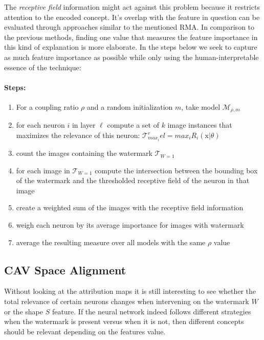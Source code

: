 {The \textit{receptive field} information might act against this problem because it restricts attention to the encoded concept. It's overlap with the feature in question can be evaluated through approaches similar to the mentioned RMA. 
In comparison to the previous methods, finding one value that measures the feature importance in this kind of explanation is more elaborate. In the steps below we seek to capture as much feature importance as possible while only using the human-interpretable essence of the technique:

\paragraph{Steps:}
\begin{enumerate}
    \item For a coupling ratio $\rho$ and a random initialization $m$, take model $\mathcal{M}_{\rho, m}$
    \item for each neuron $i$ in layer $\ell$ compute a set of $k$ image instances that maximizes the relevance of this neuron: $\mathcal{T}_{max_i}^rel = max_i R_i(\mathrm{x} | \theta)$ 
    \item count the images containing the watermark $\mathcal{T}_{W=1}$
    \item for each image in $\mathcal{T}_{W=1}$ compute the intersection between the bounding box of the watermark and the thresholded receptive field of the neuron in that image
    \item create a weighted sum of the images with the receptive field information
    \item weigh each neuron by its average importance for images with watermark
    \item average the resulting measure over all models with the same $\rho$ value 
\end{enumerate}}


\subsection{CAV Space Alignment}
Without looking at the attribution maps it is still interesting to see whether the total relevance of certain neurons changes when intervening on the watermark $W$ or the shape $S$ feature. If the neural network indeed follows different strategies when the watermark is present versus when it is not, then different concepts should be relevant depending on the features value. 

